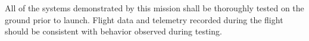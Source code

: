 
All of the systems demonstrated by this mission shall be thoroughly tested
on the ground prior to launch. Flight data and telemetry recorded during the
flight should be consistent with behavior observed during testing. 